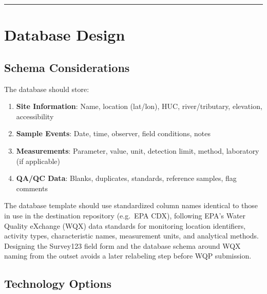 \documentclass[
  letterpaper,
]{scrbook}
\providecommand{\tightlist}{%
  \setlength{\itemsep}{0pt}\setlength{\parskip}{0pt}}\usepackage{longtable,booktabs,array}
\begin{document}
\begin{center}\rule{0.5\linewidth}{0.5pt}\end{center}

\section{Database Design}\label{database-design}

\subsection{Schema Considerations}\label{schema-considerations}

The database should store:

\begin{enumerate}
\def\labelenumi{\arabic{enumi}.}
\tightlist
\item
  \textbf{Site Information}: Name, location (lat/lon), HUC,
  river/tributary, elevation, accessibility
\item
  \textbf{Sample Events}: Date, time, observer, field conditions, notes
\item
  \textbf{Measurements}: Parameter, value, unit, detection limit,
  method, laboratory (if applicable)
\item
  \textbf{QA/QC Data}: Blanks, duplicates, standards, reference samples,
  flag comments
\end{enumerate}

The database template should use standardized column names identical to
those in use in the destination repository (e.g.~EPA CDX), following
EPA's Water Quality eXchange (WQX) data standards for monitoring
location identifiers, activity types, characteristic names, measurement
units, and analytical methods. Designing the Survey123 field form and
the database schema around WQX naming from the outset avoids a later
relabeling step before WQP submission.

\subsection{Technology Options}\label{technology-options}
\end{document}
